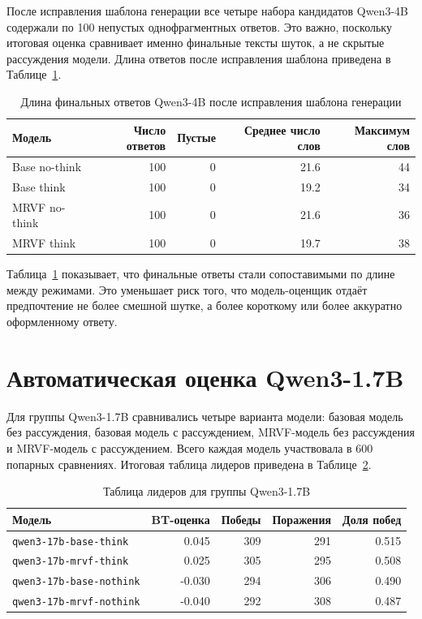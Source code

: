 После исправления шаблона генерации все четыре набора кандидатов Qwen3-4B содержали по 100 непустых однофрагментных ответов. Это важно, поскольку итоговая оценка сравнивает именно финальные тексты шуток, а не скрытые рассуждения модели. Длина ответов после исправления шаблона приведена в Таблице~\ref{tab:candidate-lengths-4b}.

\begin{table}[h]
  \centering
  \caption{Длина финальных ответов Qwen3-4B после исправления шаблона генерации}
  \label{tab:candidate-lengths-4b}
  \begin{tabular}{lrrrr}
    \hline
    Модель        & Число ответов & Пустые & Среднее число слов & Максимум слов \\
    \hline
    Base no-think & 100           & 0      & 21.6               & 44            \\
    Base think    & 100           & 0      & 19.2               & 34            \\
    MRVF no-think & 100           & 0      & 21.6               & 36            \\
    MRVF think    & 100           & 0      & 19.7               & 38            \\
    \hline
  \end{tabular}
\end{table}

Таблица~\ref{tab:candidate-lengths-4b} показывает, что финальные ответы стали сопоставимыми по длине между режимами. Это уменьшает риск того, что модель-оценщик отдаёт предпочтение не более смешной шутке, а более короткому или более аккуратно оформленному ответу.

\section{Автоматическая оценка Qwen3-1.7B}

Для группы Qwen3-1.7B сравнивались четыре варианта модели: базовая модель без рассуждения, базовая модель с рассуждением, MRVF-модель без рассуждения и MRVF-модель с рассуждением. Всего каждая модель участвовала в 600 попарных сравнениях. Итоговая таблица лидеров приведена в Таблице~\ref{tab:leaderboard-17b}.

\begin{table}[h]
  \centering
  \caption{Таблица лидеров для группы Qwen3-1.7B}
  \label{tab:leaderboard-17b}
  \begin{tabular}{p{7.2cm}rrrr}
    \hline
    Модель                          & BT-оценка & Победы & Поражения & Доля побед \\
    \hline
    \texttt{qwen3-17b-base-think}   & 0.045     & 309    & 291       & 0.515      \\
    \texttt{qwen3-17b-mrvf-think}   & 0.025     & 305    & 295       & 0.508      \\
    \texttt{qwen3-17b-base-nothink} & -0.030    & 294    & 306       & 0.490      \\
    \texttt{qwen3-17b-mrvf-nothink} & -0.040    & 292    & 308       & 0.487      \\
    \hline
  \end{tabular}
\end{table}

